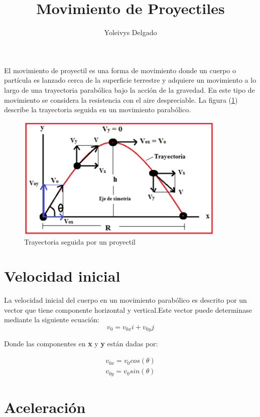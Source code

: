 \documentclass[12pt,a4paper]{article}
\author{Yoleivys Delgado}
\title{\textbf{Movimiento de Proyectiles}}
\begin{document}
\maketitle
El movimiento de proyectil es una forma de movimiento donde un cuerpo o partícula es lanzado cerca de la superficie terrestre y adquiere un movimiento a lo largo de una trayectoria parabólica bajo la acción de la gravedad. En este tipo de movimiento se considera la resistencia con el aire despreciable. La figura (\ref{fig:figura1})  describe la trayectoria seguida en un movimiento parabólico.

\begin{figure}[htbp]
 \centering
\includegraphics[width=10cm]{figura1.png} 
\caption{Trayectoria seguida por un proyectil} \label{fig:figura1}
\end{figure}

\section{ Velocidad inicial}

La velocidad inicial del cuerpo en un movimiento parabólico es descrito por un vector que tiene componente horizontal y vertical.Este vector puede determinase mediante la siguiente ecuación:
\begin{equation}
v_0 = v_{0x}i+ v_{0y}j 
\end{equation}

Donde las componentes en \textbf{x} y \textbf{y} están dadas por:

\begin{eqnarray}
v_{0x} =v_{0} cos (\theta)\\
v_{0y} =v_{0} sin (\theta)
\end{eqnarray}

\section{Aceleración}
\end{document}
